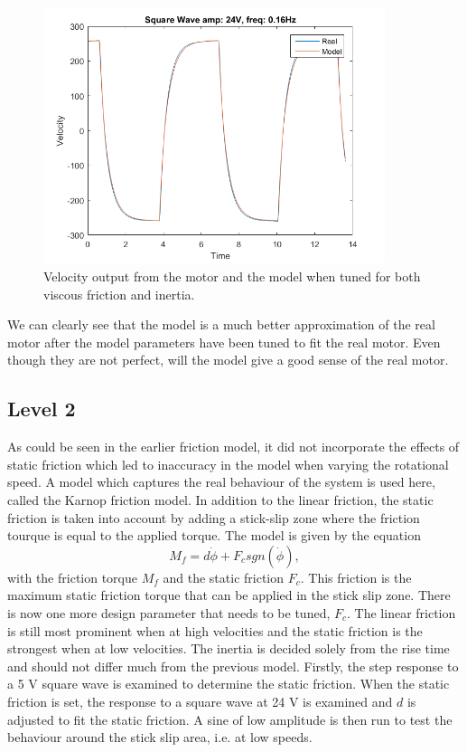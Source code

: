 \documentclass[12pt,a4paper]{article}
\begin{document}
\begin{figure}[H]
    \centering
    \includegraphics[width=100mm]{l1_sq_a24_f016.png}
    \caption{Velocity output from the motor and the model when tuned for
    both viscous friction and inertia.}
    \label{fig:l1_sq_a24_f016}
\end{figure}

We can clearly see that the model is a much better approximation of the
real motor after the model parameters have been tuned to fit the
real motor. Even though they are not perfect, will the model give a good
sense of the real motor.
\subsection*{Level 2}
\label{sub:level_2}
As could be seen in the earlier friction model, it did not incorporate the
effects of static friction which led to inaccuracy in the model when varying the
rotational speed. A model which captures the real behaviour of the system is
used here, called the Karnop friction model. In addition to the linear friction,
the static friction is taken into account by adding a stick-slip zone where the
friction tourque is equal to the applied torque. The model is given by the
equation
\begin{equation}
    \label{eq:karnop}
    M_f = d \dot{\phi} + F_c sgn(\dot{\phi}),
\end{equation}
with the friction torque $M_f$ and the static friction $F_c$. This
friction is the maximum static friction torque that can be applied in
the stick slip zone.  There is now one more design parameter that needs
to be tuned, $F_c$.  The linear friction is still most prominent when at
high velocities and the static friction is the strongest when at low
velocities. The inertia is decided solely from the rise time and should
not differ much from the previous model.  Firstly, the step response to
a 5 V square wave is examined to determine the static friction. When the
static friction is set, the response to a square wave at 24 V is
examined and $d$ is adjusted to fit the static friction. A sine of low
amplitude is then run to test the behaviour around the stick slip area,
i.e.  at low speeds.\\
\end{document}
